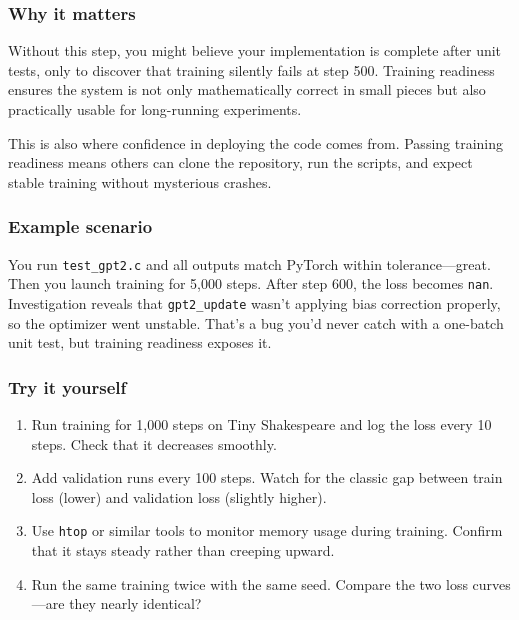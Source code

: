 \documentclass[
  letterpaper,
  DIV=11,
  numbers=noendperiod]{scrreprt}
\providecommand{\tightlist}{%
  \setlength{\itemsep}{0pt}\setlength{\parskip}{0pt}}
\begin{document}
\subsubsection{Why it matters}\label{why-it-matters-35}

Without this step, you might believe your implementation is complete
after unit tests, only to discover that training silently fails at step
500. Training readiness ensures the system is not only mathematically
correct in small pieces but also practically usable for long-running
experiments.

This is also where confidence in deploying the code comes from. Passing
training readiness means others can clone the repository, run the
scripts, and expect stable training without mysterious crashes.

\subsubsection{Example scenario}\label{example-scenario-3}

You run \texttt{test\_gpt2.c} and all outputs match PyTorch within
tolerance---great. Then you launch training for 5,000 steps. After step
600, the loss becomes \texttt{nan}. Investigation reveals that
\texttt{gpt2\_update} wasn't applying bias correction properly, so the
optimizer went unstable. That's a bug you'd never catch with a one-batch
unit test, but training readiness exposes it.

\subsubsection{Try it yourself}\label{try-it-yourself-47}

\begin{enumerate}
\def\labelenumi{\arabic{enumi}.}
\tightlist
\item
  Run training for 1,000 steps on Tiny Shakespeare and log the loss
  every 10 steps. Check that it decreases smoothly.
\item
  Add validation runs every 100 steps. Watch for the classic gap between
  train loss (lower) and validation loss (slightly higher).
\item
  Use \texttt{htop} or similar tools to monitor memory usage during
  training. Confirm that it stays steady rather than creeping upward.
\item
  Run the same training twice with the same seed. Compare the two loss
  curves---are they nearly identical?
\end{enumerate}
\end{document}

